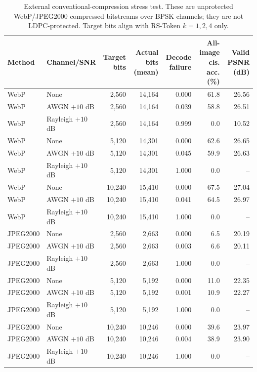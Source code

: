 \documentclass[lettersize,journal]{IEEEtran}
\begin{document}
\begin{table}[!t]
\centering
\caption{External conventional-compression stress test. These are unprotected WebP/JPEG2000 compressed bitstreams over BPSK channels; they are not LDPC-protected. Target bits align with RS-Token $k=1,2,4$ only.}
\label{tab:classic_unprotected}
\begin{tabular}{@{}llrrrrr@{}}
\toprule
Method & Channel/SNR & Target bits & Actual bits (mean) & Decode failure & All-image cls. acc. (\%) & Valid PSNR (dB) \\
\midrule
WebP & None & 2{,}560 & 14{,}164 & 0.000 & 61.8 & 26.56 \\
WebP & AWGN $+10$ dB & 2{,}560 & 14{,}164 & 0.039 & 58.8 & 26.51 \\
WebP & Rayleigh $+10$ dB & 2{,}560 & 14{,}164 & 0.999 & 0.0 & 10.52 \\
WebP & None & 5{,}120 & 14{,}301 & 0.000 & 62.6 & 26.65 \\
WebP & AWGN $+10$ dB & 5{,}120 & 14{,}301 & 0.045 & 59.9 & 26.63 \\
WebP & Rayleigh $+10$ dB & 5{,}120 & 14{,}301 & 1.000 & 0.0 & -- \\
WebP & None & 10{,}240 & 15{,}410 & 0.000 & 67.5 & 27.04 \\
WebP & AWGN $+10$ dB & 10{,}240 & 15{,}410 & 0.041 & 64.5 & 26.97 \\
WebP & Rayleigh $+10$ dB & 10{,}240 & 15{,}410 & 1.000 & 0.0 & -- \\
\midrule
JPEG2000 & None & 2{,}560 & 2{,}663 & 0.000 & 6.5 & 20.19 \\
JPEG2000 & AWGN $+10$ dB & 2{,}560 & 2{,}663 & 0.003 & 6.6 & 20.11 \\
JPEG2000 & Rayleigh $+10$ dB & 2{,}560 & 2{,}663 & 1.000 & 0.0 & -- \\
JPEG2000 & None & 5{,}120 & 5{,}192 & 0.000 & 11.0 & 22.35 \\
JPEG2000 & AWGN $+10$ dB & 5{,}120 & 5{,}192 & 0.001 & 10.9 & 22.27 \\
JPEG2000 & Rayleigh $+10$ dB & 5{,}120 & 5{,}192 & 1.000 & 0.0 & -- \\
JPEG2000 & None & 10{,}240 & 10{,}246 & 0.000 & 39.6 & 23.97 \\
JPEG2000 & AWGN $+10$ dB & 10{,}240 & 10{,}246 & 0.004 & 38.9 & 23.90 \\
JPEG2000 & Rayleigh $+10$ dB & 10{,}240 & 10{,}246 & 1.000 & 0.0 & -- \\
\bottomrule
\end{tabular}
\end{table}
\end{document}
